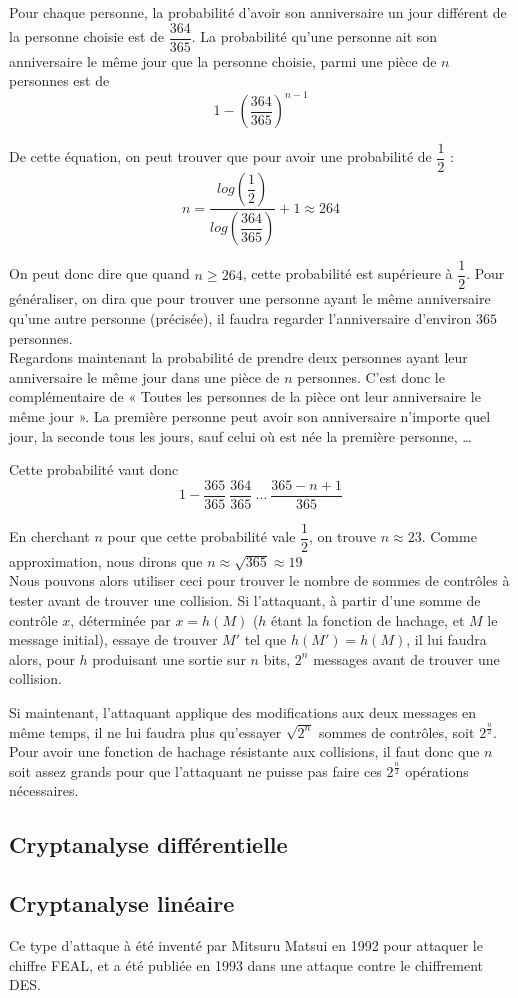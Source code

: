 Pour chaque personne, la probabilité d'avoir son anniversaire un
jour différent de la personne choisie est de $\dfrac{364}{365}$.
La probabilité qu'une personne ait son anniversaire le même jour
que la personne choisie, parmi une pièce de $n$ personnes est de
\[ 1 - \left(\dfrac{364}{365}\right)^{n-1} \]

De cette équation, on peut trouver que pour avoir une probabilité
de $\dfrac{1}{2}$ : 
\[ n =
\dfrac{log\left(\dfrac{1}{2}\right)}{log\left(\dfrac{364}{365}\right)}
+ 1 \approx 264 \]

On peut donc dire que quand $n \geq 264$, cette probabilité est
supérieure à $\dfrac{1}{2}$. Pour généraliser, on dira que pour
trouver une personne ayant le même anniversaire qu'une autre
personne (précisée), il faudra regarder l'anniversaire d'environ
$365$ personnes.
\\

Regardons maintenant la probabilité de prendre deux personnes
ayant leur anniversaire le même jour dans une pièce de $n$
personnes. C'est donc le complémentaire de « Toutes les personnes
de la pièce ont leur anniversaire le même jour ».
La première personne peut avoir son anniversaire n'importe quel
jour, la seconde tous les jours, sauf celui où est née la première
personne, …

Cette probabilité vaut donc
\[1 - \dfrac{365}{365} ~ \dfrac{364}{365} ~ \dots ~ \dfrac{365 - n
+ 1}{365} \]

En cherchant $n$ pour que cette probabilité vale 
$\dfrac{1}{2}$, on trouve $n \approx 23$. Comme approximation, nous
dirons que $n \approx \sqrt{365} \approx 19$
\\

Nous pouvons alors utiliser ceci pour trouver le nombre
de sommes de contrôles à tester avant de trouver une collision.
Si l'attaquant, à partir d'une somme de contrôle $x$,
déterminée par $x = h(M)$ ($h$ étant la fonction de hachage, et
$M$ le message initial), essaye de trouver $M'$ tel que $h(M') =
h(M)$, il lui faudra alors, pour $h$ produisant une sortie sur $n$
bits, $2^n$ messages avant de trouver une collision.

Si maintenant, l'attaquant applique des modifications aux deux
messages en même temps, il ne lui faudra plus qu'essayer
$\sqrt{2^n}$ sommes de contrôles, soit $2^{\frac{n}{2}}$.
Pour avoir une fonction de hachage résistante aux collisions, il
faut donc que $n$ soit assez grands pour que l'attaquant ne puisse
pas faire ces $2^{\frac{n}{2}}$ opérations nécessaires.

\subsection{Cryptanalyse différentielle}

\subsection{Cryptanalyse linéaire}
Ce type d'attaque à été inventé par Mitsuru Matsui en 1992 pour
attaquer le chiffre FEAL, et a été publiée en 1993  dans une
attaque contre le chiffrement DES.


